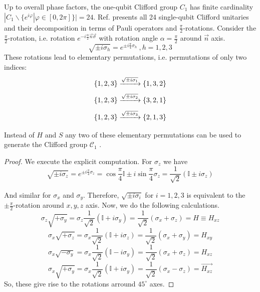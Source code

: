 \documentclass[10pt,a4paper]{book}
\numberwithin{equation}{chapter}
\numberwithin{figure}{chapter}
\numberwithin{table}{chapter}
\begin{document}
Up to overall phase factors, the one-qubit Clifford group $C_{1}$ has finite cardinality $|C_{1} \backslash \lbrace e^{i\varphi}|\varphi\in [0,2\pi]\rbrace |=24$. Ref. \cite{EinGS} presents all 24 single-qubit Clifford unitaries and their decomposition in terms of Pauli operators and $\frac{\pi}{2}$-rotations.
Consider the $\frac{\pi}{2}$-rotation, i.e. rotation $e^{-i\frac{\alpha}{2}\vec{n}\vec{\sigma}}$ with rotation angle $\alpha=\frac{\pi}{2}$ around $\vec{n}$ axis. 
\begin{equation}
\sqrt{\pm i \sigma_{h}}=e^{\pm i \frac{\pi}{4}\sigma_{h}} \ , h=1,2,3 
\end{equation}
These rotations lead to elementary permutations, i.e. permutations of only two indices:
$$ \lbrace 1,2,3 \rbrace \\ \xrightarrow{\sqrt{\pm i \sigma_{1}}} \\ \lbrace 1,3,2 \rbrace$$
$$ \lbrace 1,2,3 \rbrace \\ \xrightarrow{\sqrt{\pm i \sigma_{2}}} \\ \lbrace 3,2,1 \rbrace$$
$$ \lbrace 1,2,3 \rbrace \\ \xrightarrow{\sqrt{\pm i \sigma_{3}}} \\ \lbrace 2,1,3 \rbrace$$

Instead of $H$ and $S$ any two of these elementary permutations can be used
to generate the Clifford group $\mathcal{C}_1$ .
\begin{proof}
We execute the explicit computation. For $\sigma_{z}$ we have
\begin{equation}
\sqrt{\pm i \sigma_{z}}=e^{\pm i \frac{\pi}{4}\sigma_{z}}=\cos \frac{\pi}{4}\mathbb{I} \pm i \sin \frac{\pi}{4}\sigma_{z}=\frac{1}{\sqrt{2}}\left( \mathbb{I}\pm i \sigma_{z} \right)
\end{equation}

And similar for $\sigma_{x}$ and $\sigma_{y}$. Therefore, $\sqrt{\pm i \sigma_{i}}$ for $i=1,2,3$ is equivalent to the $\pm \frac{\pi}{2}$-rotation around $x,y,z$ axis. Now, we do the following calculations.
\begin{equation}
\sigma_{z}\sqrt{+\sigma_{y}}=\sigma_{z}\frac{1}{\sqrt{2}}\left( \mathbb{I}+ i \sigma_{y} \right)= \frac{1}{\sqrt{2}}\left( \sigma_{x} + \sigma_{z} \right) = H \equiv H_{xz}
\end{equation}
\begin{equation}
\sigma_{x}\sqrt{+\sigma_{z}}=\sigma_{x}\frac{1}{\sqrt{2}}\left( \mathbb{I}+ i \sigma_{z} \right)= \frac{1}{\sqrt{2}}\left( \sigma_{x} + \sigma_{y} \right)=H_{xy}
\end{equation}
\begin{equation}
 \sigma_{x}\sqrt{-\sigma_{y}}=\sigma_{x}\frac{1}{\sqrt{2}}\left( \mathbb{I}- i \sigma_{y} \right)= \frac{1}{\sqrt{2}}\left( \sigma_{x} + \sigma_{z} \right)= H_{xz}
\end{equation}
\begin{equation}
\sigma_{x}\sqrt{+\sigma_{y}}=\sigma_{x}\frac{1}{\sqrt{2}}\left( \mathbb{I}+ i \sigma_{y} \right)=\frac{1}{\sqrt{2}}\left( \sigma_{x} - \sigma_{z} \right)=\vec{H_{xz}}
\end{equation}
So, these give rise to the rotations arround $45^{\circ}$ axes. 
\end{proof}
\end{document}

